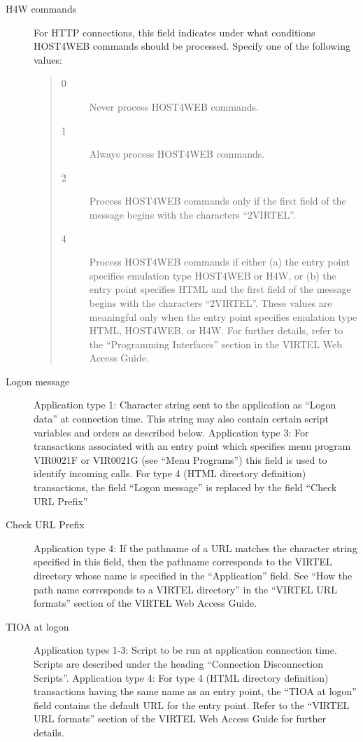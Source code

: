 \documentclass[letterpaper,10pt,english]{sphinxmanual}
\begin{document}
\begin{description}
\item[{H4W commands}] \leavevmode
For HTTP connections, this field indicates under what conditions HOST4WEB commands should be processed. Specify one of the following values:
\begin{quote}
\begin{description}
\item[{0}] \leavevmode
Never process HOST4WEB commands.

\item[{1}] \leavevmode
Always process HOST4WEB commands.

\item[{2}] \leavevmode
Process HOST4WEB commands only if the first field of the message begins with the characters “2VIRTEL”.

\item[{4}] \leavevmode
Process HOST4WEB commands if either (a) the entry point specifies emulation type HOST4WEB or H4W, or (b) the entry point specifies HTML and the first field of the message begins with the characters “2VIRTEL”.
These values are meaningful only when the entry point specifies emulation type HTML, HOST4WEB, or H4W. For further details, refer to the “Programming Interfaces” section in the VIRTEL Web Access Guide.

\end{description}
\end{quote}

\item[{Logon message}] \leavevmode
Application type 1: Character string sent to the application as “Logon data” at connection time. This string may also contain certain script variables and orders as described below.
Application type 3: For transactions associated with an entry point which specifies menu program VIR0021F or VIR0021G (see “Menu Programs”) this field is used to identify incoming calls. For type 4 (HTML directory definition) transactions, the field “Logon message” is replaced by the field “Check URL Prefix”

\item[{Check URL Prefix}] \leavevmode
Application type 4: If the pathname of a URL matches the character string specified in this field, then the pathname corresponds to the VIRTEL directory whose name is specified in the “Application” field. See “How the path name corresponds to a VIRTEL directory” in the “VIRTEL URL formats” section of the VIRTEL Web Access Guide.

\item[{TIOA at logon}] \leavevmode
Application types 1-3: Script to be run at application connection time. Scripts are described under the heading “Connection \textendash{} Disconnection Scripts”. Application type 4: For type 4 (HTML directory definition) transactions having the same name as an entry point, the “TIOA at logon” field contains the default URL for the entry point. Refer to the “VIRTEL URL formats” section of the VIRTEL Web Access Guide for further details.


\end{description}
\end{document}

